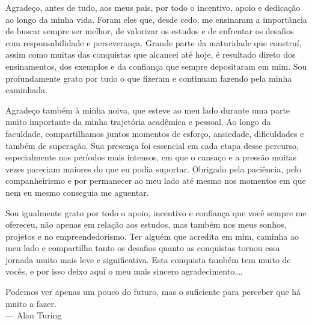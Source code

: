 \documentclass[tcc,capa]{texufpel}
\begin{document}
\begin{agradecimentos}
  Agradeço, antes de tudo, aos meus pais, por todo o incentivo, apoio e dedicação ao longo da minha vida. Foram eles que, desde cedo, me ensinaram a importância de buscar sempre ser melhor, de valorizar os estudos e de enfrentar os desafios com responsabilidade e perseverança. Grande parte da maturidade que construí, assim como muitas das conquistas que alcancei até hoje, é resultado direto dos ensinamentos, dos exemplos e da confiança que sempre depositaram em mim. Sou profundamente grato por tudo o que fizeram e continuam fazendo pela minha caminhada.
  
  Agradeço também à minha noiva, que esteve ao meu lado durante uma parte muito importante da minha trajetória acadêmica e pessoal. Ao longo da faculdade, compartilhamos juntos momentos de esforço, ansiedade, dificuldades e também de superação. Sua presença foi essencial em cada etapa desse percurso, especialmente nos períodos mais intensos, em que o cansaço e a pressão muitas vezes pareciam maiores do que eu podia suportar. Obrigado pela paciência, pelo companheirismo e por permanecer ao meu lado até mesmo nos momentos em que nem eu mesmo conseguia me aguentar.
  
  Sou igualmente grato por todo o apoio, incentivo e confiança que você sempre me ofereceu, não apenas em relação aos estudos, mas também nos meus sonhos, projetos e no empreendedorismo. Ter alguém que acredita em mim, caminha ao meu lado e compartilha tanto os desafios quanto as conquistas tornou essa jornada muito mais leve e significativa. Esta conquista também tem muito de vocês, e por isso deixo aqui o meu mais sincero agradecimento.\ldots 
\end{agradecimentos}

\begin{epigrafe}
  Podemos ver apenas um pouco do futuro, mas o suficiente para perceber que há muito a fazer.\\
  {\sc --- Alan Turing}
\end{epigrafe}
\end{document}
